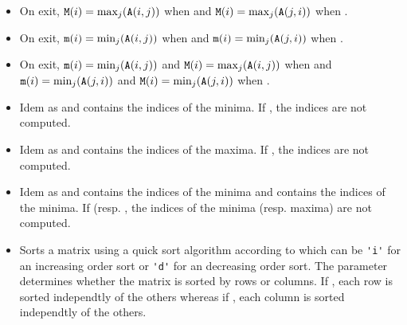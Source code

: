 \begin{itemize}
\item {}
  \sshortdescribe On exit, ${\tt M}(i) = \max_{j}({\tt A}(i, j))$ when 
  and ${\tt M}(i) = \max_{j}({\tt A}(j, i))$ when .

\item {}
  \sshortdescribe On exit, ${\tt m}(i) = \min_{j}({\tt A}(i, j))$ when 
  and ${\tt m}(i) = \min_{j}({\tt A}(j, i))$ when .

\item {}
  \sshortdescribe On exit, ${\tt m}(i) = \min_{j}({\tt A}(i, j))$ and ${\tt M}(i) =
  \max_{j}({\tt A}(i, j))$ when  and ${\tt m}(i) = \min_{j}({\tt A}(j, i))$
  and ${\tt M}(i) = \min_{j}({\tt A}(j, i))$ when .
  
\item {}
  \sshortdescribe Idem as  and  contains the
  indices of the minima. If , the indices are not computed.

\item {}
  \sshortdescribe Idem as  and  contains the
  indices of the maxima. If , the indices are not computed.

\item {}
  \sshortdescribe Idem as  and  contains the
  indices of the minima and  contains the indices of the minima. If
   (resp. , the indices of the minima
  (resp. maxima) are not computed.

\item {}
  \sshortdescribe Sorts a matrix using a quick sort algorithm according to
   which can be \verb!'i'! for an increasing order sort or
  \verb!'d'! for an decreasing order sort. The parameter  determines
  whether the matrix is sorted by rows or columns. If , each row
  is sorted independtly of the others whereas if , each column
  is sorted independtly of the others.


\end{itemize}

